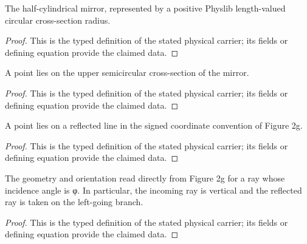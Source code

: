 \begin{definition}
  \label{def:physics:IPhO_2026_2_C_2:aux007}
  The half-cylindrical mirror, represented by a positive Physlib
  length-valued circular cross-section radius.
\end{definition}
\begin{proof}
  This is the typed definition of the stated physical carrier; its fields or defining equation provide the claimed data.
\end{proof}

\begin{definition}
  \label{def:physics:IPhO_2026_2_C_2:aux008}
  A point lies on the upper semicircular cross-section of the mirror.
\end{definition}
\begin{proof}
  This is the typed definition of the stated physical carrier; its fields or defining equation provide the claimed data.
\end{proof}

\begin{definition}
  \label{def:physics:IPhO_2026_2_C_2:aux009}
  A point lies on a reflected line in the signed coordinate convention of Figure 2g.
\end{definition}
\begin{proof}
  This is the typed definition of the stated physical carrier; its fields or defining equation provide the claimed data.
\end{proof}

\begin{definition}
  \label{def:physics:IPhO_2026_2_C_2:aux010}
  The geometry and orientation read directly from Figure 2g for a ray whose incidence angle is φ. In particular, the incoming ray is vertical and the reflected ray is taken on the left-going branch.
\end{definition}
\begin{proof}
  This is the typed definition of the stated physical carrier; its fields or defining equation provide the claimed data.
\end{proof}

